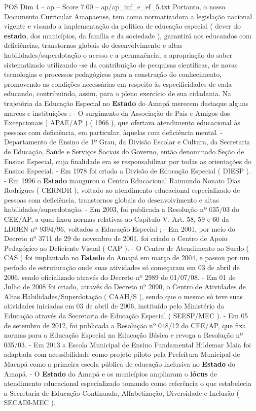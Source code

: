 \begin{textsample}{POS Dim 4 – ap – Score 7.00 – ap/ap\_inf\_e\_ef\_5.txt}
Portanto, o nosso Documento Curricular Amapaense, tem como normatizadora a legislação nacional vigente e visando a implementação da política de educação especial ( dever do \textbf{estado}, dos municípios, da família e da sociedade ), garantirá aos educandos com deficiências, transtornos globais do desenvolvimento e altas habilidades/superdotação o acesso e a permanência, a apropriação do saber sistematizado utilizando -se da contribuição de pesquisas científicas, de novas tecnologias e processos pedagógicos para a construção do conhecimento, promovendo as condições necessárias em respeito às especificidades de cada educando, contribuindo, assim, para o pleno exercício de sua cidadania.
Na trajetória da Educação Especial no \textbf{Estado} do Amapá merecem destaque alguns marcos e instituições : - O surgimento da Associação de Pais e Amigos dos Excepcionais ( APAE/AP ) ( 1966 ), que ofertava atendimento educacional às pessoas com deficiência, em particular, àquelas com deficiência mental. - Departamento de Ensino de 1º Grau, da Divisão Escolar e Cultura, da Secretaria de Educação, Saúde e Serviços Sociais do Governo, então denominado Seção de Ensino Especial, cuja finalidade era se responsabilizar por todas as orientações do Ensino Especial. - Em 1978 foi criada a Divisão de Educação Especial ( DIESP ). - Em 1996 o \textbf{Estado} inaugurou o Centro Educacional Raimundo Nonato Dias Rodrigues ( CERNDR ), voltado ao atendimento educacional especializado de pessoas com deficiência, transtornos globais do desenvolvimento e altas habilidades/superdotação. - Em 2003, foi publicada a Resolução nº 035/03 do CEE/AP, a qual fixou normas relativas ao Capítulo V, Art. 58, 59 e 60 da LDBEN nº 9394/96, voltados a Educação Especial ; - Em 2001, por meio do Decreto nº 3711 de 29 de novembro de 2001, foi criado o Centro de Apoio Pedagógico ao Deficiente Visual ( CAP ). - O Centro de Atendimento ao Surdo ( CAS ) foi implantado no \textbf{Estado} do Amapá em março de 2004, e passou por um período de estruturação onde suas atividades só começaram em 03 de abril de 2006, sendo oficializado através do Decreto nº 2989 de 01/07/08. - Em 01 de Julho de 2008 foi criado, através do Decreto nº 2090, o Centro de Atividades de Altas Habilidades/Superdotação ( CAAH/S ), sendo que o mesmo só teve suas atividades iniciadas em 03 de abril de 2006, instituído pelo Ministério da Educação através da Secretaria de Educação Especial ( SEESP/MEC ). - Em 05 de setembro de 2012, foi publicada a Resolução nº 048/12 do CEE/AP, que fixa normas para a Educação Especial na Educação Básica e revoga a Resolução nº 035/03. - Em 2013 a Escola Municipal de Ensino Fundamental Hildemar Maia foi adaptada com acessibilidade como projeto piloto pela Prefeitura Municipal de Macapá como a primeira escola pública de educação inclusiva no \textbf{Estado} do Amapá. - O \textbf{Estado} do Amapá e os municípios ampliaram o \textbf{lócus} de atendimento educacional especializado tomando como referência o que estabelecia a Secretaria de Educação Continuada, Alfabetização, Diversidade e Inclusão ( SECADI-MEC ).

\end{textsample}
